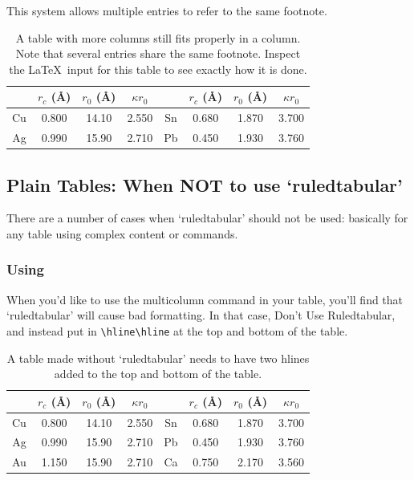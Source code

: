 \documentclass[reprint]{JASA}
\begin{document}
This system allows
multiple entries to refer to the same
footnote.   


\begin{table}[ht]
\caption{\label{tab:table1}A table with more columns still fits
properly in a column. Note that several entries share the same
footnote. Inspect the \LaTeX\ input for this table to see
exactly how it is done.}

\begin{ruledtabular}
\begin{tabular}{cccccccc}
 &$r_c$ (\AA)\footnotemark[1]&$r_0$ (\AA)&$\kappa r_0$&
 &$r_c$ (\AA) &$r_0$ (\AA)&$\kappa r_0$\\
\hline
Cu& 0.800 & 14.10 & 2.550 &Sn\footnotemark[1]
& 0.680 & 1.870 & 3.700 \\
Ag& 0.990 & 15.90 & 2.710 &Pb\footnotemark[2]
& 0.450 & 1.930 & 3.760 \\
\end{tabular}
\end{ruledtabular}
\end{table}

\subsection{Plain Tables: When NOT to use `ruledtabular'}
There are a number of cases when `ruledtabular' should not
be used: basically for any table using complex content or 
commands.

\subsubsection{Using {\tt\string\multicolumn}}
When you'd like to use the multicolumn command in your
table, you'll find that `ruledtabular' will cause bad
formatting. In that case, Don't Use Ruledtabular, and
instead put in \verb+\hline\hline+ at the top and bottom of
the table. 


\begin{table}[ht]
\caption{A table made without `ruledtabular' needs to have two hlines
added to the top and bottom of the table.}
\vskip3pt
\begin{tabular}{cccccccc}
\hline\hline
 &$r_c$ (\AA)\footnotemark[1]&$r_0$ (\AA)&$\kappa r_0$&
 &$r_c$ (\AA) &$r_0$ (\AA)&$\kappa r_0$\\
\hline
Cu& 0.800 & 14.10 & 2.550 &Sn\footnotemark[1]
& 0.680 & 1.870 & 3.700 \\
Ag& 0.990 & 15.90 & 2.710 &Pb\footnotemark[2]
& 0.450 & 1.930 & 3.760 \\
Au& 1.150 & 15.90 & 2.710 &Ca\footnotemark[3]
& 0.750 & 2.170 & 3.560\\
\hline\hline
\end{tabular}
\end{table}
\end{document}
